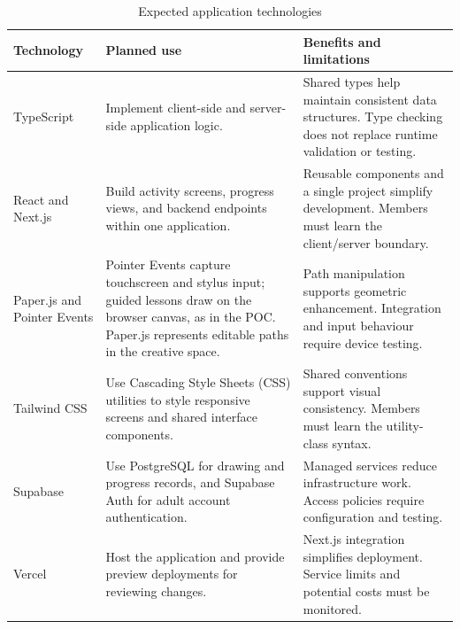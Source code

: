 \documentclass{article}
\begin{document}
\begin{table}[htbp]
    \centering
    \caption{Expected application technologies}
    \label{tab:application-technologies}
    \small
    \renewcommand{\arraystretch}{1.15}
    \begin{tabularx}{\textwidth}{
        @{}>{\raggedright\arraybackslash}p{}
        >{\raggedright\arraybackslash}X
        >{\raggedright\arraybackslash}X@{}
    }
        \toprule
        \textbf{Technology} &
        \textbf{Planned use} &
        \textbf{Benefits and limitations} \\
        \midrule

        TypeScript &
        Implement client-side and server-side application logic. &
        Shared types help maintain consistent data structures.
        Type checking does not replace runtime validation or testing. \\
        \addlinespace

        React and Next.js &
        Build activity screens, progress views, and backend endpoints
        within one application. &
        Reusable components and a single project simplify development.
        Members must learn the client/server boundary. \\
        \addlinespace

        Paper.js and Pointer Events &
        Pointer Events capture touchscreen and stylus input; guided
        lessons draw on the browser canvas, as in the POC. Paper.js
        represents editable paths in the creative space. &
        Path manipulation supports geometric enhancement.
        Integration and input behaviour require device testing. \\
        \addlinespace

        Tailwind CSS &
        Use Cascading Style Sheets (CSS) utilities to style responsive
        screens and shared interface components. &
        Shared conventions support visual consistency.
        Members must learn the utility-class syntax. \\
        \addlinespace

        Supabase &
        Use PostgreSQL for drawing and progress records, and
        Supabase Auth for adult account authentication. &
        Managed services reduce infrastructure work.
        Access policies require configuration and testing. \\
        \addlinespace

        Vercel &
        Host the application and provide preview deployments
        for reviewing changes. &
        Next.js integration simplifies deployment.
        Service limits and potential costs must be monitored. \\

        \bottomrule
    \end{tabularx}
\end{table}
\end{document}
